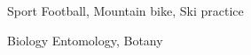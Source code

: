 

\begin{cvpairs}

  
\cvpair
    {Sport} %
    {Football, Mountain bike, Ski practice} %


\cvpair
    {Biology} %
    {Entomology, Botany} %

\end{cvpairs}